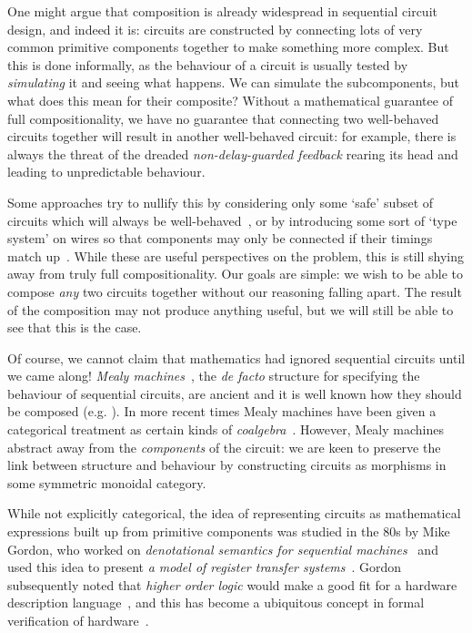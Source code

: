 One might argue that composition is already widespread in sequential circuit
design, and indeed it is: circuits are constructed by connecting lots of very
common primitive components together to make something more complex.
But this is done informally, as the behaviour of a circuit is usually tested
by \emph{simulating} it and seeing what happens.
We can simulate the subcomponents, but what does this mean for their composite?
Without a mathematical guarantee of full compositionality, we have no guarantee
that connecting two well-behaved circuits together will result in another
well-behaved circuit: for example, there is always the threat of the dreaded
\emph{non-delay-guarded feedback} rearing its head and leading to unpredictable
behaviour.

Some approaches try to nullify this by considering only some `safe' subset of
circuits which will always be well-behaved~\cite{christensen2021wire}, or by
introducing some sort of `type system' on wires so that components may only be
connected if their timings match up~\cite{nigam2023modular}.
While these are useful perspectives on the problem, this is still shying away
from truly full compositionality.
Our goals are simple: we wish to be able to compose \emph{any} two circuits
together without our reasoning falling apart.
The result of the composition may not produce anything useful, but we will still
be able to see that this is the case.

Of course, we cannot claim that mathematics had ignored sequential circuits
until we came along!
\emph{Mealy machines}~\cite{mealy1955method}, the \emph{de facto} structure for
specifying the behaviour of sequential circuits, are ancient and it is well
known how they should be composed (e.g. \cite{ginzburg2014algebraic}).
In more recent times Mealy machines have been given a categorical treatment as
certain kinds of \emph{coalgebra}~\cite{rutten2006algebraic,bonsangue2008coalgebraic}.
However, Mealy machines abstract away from the \emph{components} of the circuit:
we are keen to preserve the link between structure and behaviour by constructing
circuits as morphisms in some symmetric monoidal category.

While not explicitly categorical, the idea of representing circuits as
mathematical expressions built up from primitive components was studied in the
80s by Mike Gordon, who worked on
\emph{denotational semantics for sequential machines}~\cite{gordon1980denotational}
and used this idea to present
\emph{a model of register transfer systems}~\cite{gordon1982model}.
Gordon subsequently noted that \emph{higher order logic} would make a good fit
for a hardware description language~\cite{gordon1985why}, and this has become
a ubiquitous concept in formal verification of hardware~\cite{gupta1992formal}.

